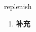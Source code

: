 
\begin{frame}
{\huge replenish}
\begin{center}
\begin{enumerate}\Large
  \item \textbf{补充}
\end{enumerate}
\end{center}
\end{frame}
